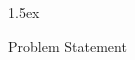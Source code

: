 \documentclass[11pt,a4paper]{article}
\begin{document}
\begin{titlepage}
    \maketitle
\end{titlepage}

\parindent 0in
\parskip 1.5ex

\begin{section}{Problem Statement}

\end{section}
\end{document}
